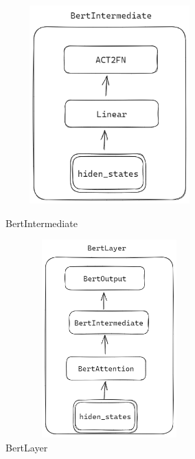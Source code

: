 \documentclass[a4paper]{article}
\begin{document}
\begin{sloppypar}
      \begin{figure}[H]
            \centering
            \begin{minipage}{0.49\linewidth}
                  \centering
                  \includegraphics[width=3.15in,height=3.0in]{BertIntermediate}
                  \caption{BertIntermediate}
                  \label{BertIntermediate}%
            \end{minipage}
            \begin{minipage}{0.49\linewidth}
                  \centering
                  \includegraphics[width=3.15in,height=3.0in]{BertLayer}
                  \caption{BertLayer}
                  \label{BertLayer}%
            \end{minipage}

      \end{figure}


\end{sloppypar}
\end{document}
